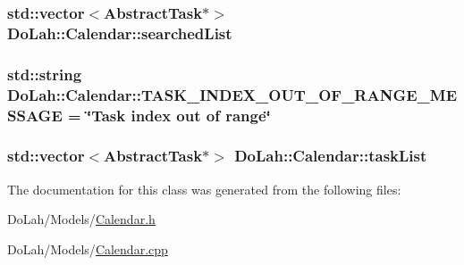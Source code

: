 \subsubsection[{searched\+List}]{\setlength{\rightskip}{0pt plus 5cm}std\+::vector$<${\bf Abstract\+Task}$\ast$$>$ Do\+Lah\+::\+Calendar\+::searched\+List\hspace{0.3cm}{\ttfamily [private]}}\label{class_do_lah_1_1_calendar_a4354b2eeb2a32b579dcab4d16fbe3f9f}
\hypertarget{class_do_lah_1_1_calendar_a6bb6992b8aeb30195175e1b742a7f2fa}{}
\subsubsection[{T\+A\+S\+K\+\_\+\+I\+N\+D\+E\+X\+\_\+\+O\+U\+T\+\_\+\+O\+F\+\_\+\+R\+A\+N\+G\+E\+\_\+\+M\+E\+S\+S\+A\+G\+E}]{\setlength{\rightskip}{0pt plus 5cm}std\+::string Do\+Lah\+::\+Calendar\+::\+T\+A\+S\+K\+\_\+\+I\+N\+D\+E\+X\+\_\+\+O\+U\+T\+\_\+\+O\+F\+\_\+\+R\+A\+N\+G\+E\+\_\+\+M\+E\+S\+S\+A\+G\+E = \char`\"{}Task index out of range\char`\"{}\hspace{0.3cm}{\ttfamily [private]}}\label{class_do_lah_1_1_calendar_a6bb6992b8aeb30195175e1b742a7f2fa}
\hypertarget{class_do_lah_1_1_calendar_aec812b23859cfd1e7cce11d4efe1ff56}{}
\subsubsection[{task\+List}]{\setlength{\rightskip}{0pt plus 5cm}std\+::vector$<${\bf Abstract\+Task}$\ast$$>$ Do\+Lah\+::\+Calendar\+::task\+List\hspace{0.3cm}{\ttfamily [private]}}\label{class_do_lah_1_1_calendar_aec812b23859cfd1e7cce11d4efe1ff56}


The documentation for this class was generated from the following files\+:\begin{DoxyCompactItemize}
\item 
Do\+Lah/\+Models/\hyperlink{_calendar_8h}{Calendar.\+h}\item 
Do\+Lah/\+Models/\hyperlink{_calendar_8cpp}{Calendar.\+cpp}\end{DoxyCompactItemize}
